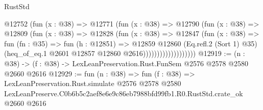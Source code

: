\begin{lexlean}{RustStd}
\begin{coremodule}
                          @12752
                            (fun (x : @38) =>
                            @12771
                              (fun (x : @38) =>
                              @12790
                                (fun (x : @38) =>
                                @12809
                                  (fun (x : @38) =>
                                  @12828
                                    (fun (x : @38) =>
                                    @12847
                                      (fun (x : @38) =>
                                      fun (fn : @35) =>
                                      fun (h : @12851) =>
                                      @12859
                                        @12860
                                        (Eq.refl.{2} (Sort 1) @35)
                                        (heq_of_eq.{1} @2601 @12857 @12860 @2616)))))))))))))))))))
@12919 := (n : @38) -> (f : @38) -> LexLeanPreservation.Rust.FunSem @2576 @2578 @2580 @2660 @2616
@12929 := fun (n : @38) =>
  fun (f : @38) =>
  LexLeanPreservation.Rust.simulate
    @2576
    @2578
    @2580
    LexLeanPreserve.C0b6b5c2aef8e6e9c86eb7988bfd99fb1.R0.RustStd.crate_ok
    @2660
    @2616
\end{coremodule}
\end{lexlean}
